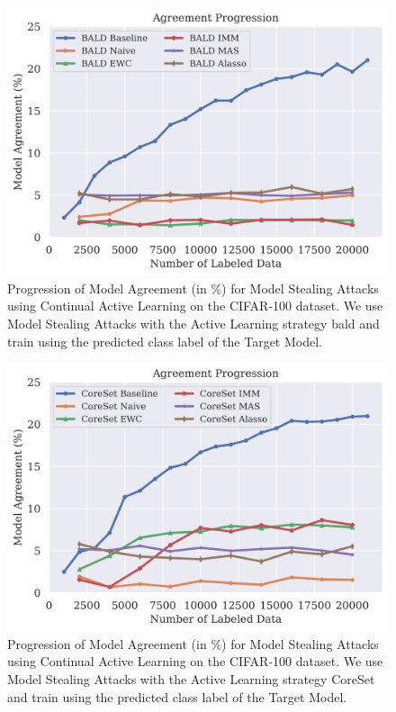 \begin{figure}[h]
    \centering
    \includegraphics[width=0.7\linewidth]{images/results_CALMS/cifar100_label_bald.png}
    \caption[Agreement Comparison for Model Stealing on CIFAR100 using the predicted class label and the Active Learning strategy BALD]{Progression of Model
    Agreement (in \%) for Model Stealing Attacks using Continual Active Learning on the CIFAR-100 dataset. We use Model Stealing Attacks with the Active Learning
    strategy \gls{bald} and train using the predicted class label of the Target Model.}
    \label{fig:CALMSCIFAR100LabelBALD}
\end{figure}

\begin{figure}[h]
    \centering
    \includegraphics[width=0.7\linewidth]{images/results_CALMS/cifar100_label_coreset.png}
    \caption[Agreement Comparison for Model Stealing on CIFAR100 using the predicted class label and the Active Learning strategy CoreSet]{Progression of Model
    Agreement (in \%) for Model Stealing Attacks using Continual Active Learning on the CIFAR-100 dataset. We use Model Stealing Attacks with the Active Learning
    strategy CoreSet and train using the predicted class label of the Target Model.}
    \label{fig:CALMSCIFAR100LabelCoreSet}
\end{figure}


